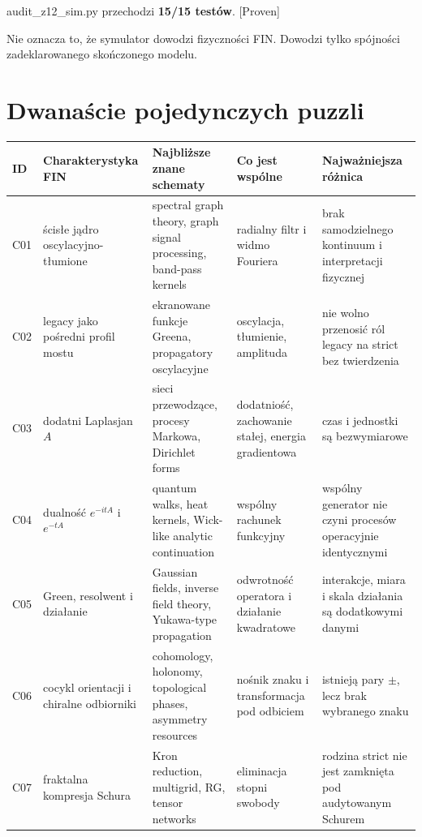 \documentclass[11pt,a4paper,openany]{report}
\newcommand{\statusProven}{\textcolor{fingreen}{[Proven]}}
\begin{document}
audit\_z12\_sim.py przechodzi \textbf{15/\allowbreak{}15 testów}. \statusProven{}

Nie oznacza to, \.ze symulator dowodzi fizyczności FIN. Dowodzi tylko spójności zadeklarowanego skończonego modelu.

\chapter{Dwanaście pojedynczych puzzli}

\begin{center}
\begingroup\footnotesize
\setlength{\tabcolsep}{3.5pt}
\renewcommand{\arraystretch}{1.16}
\begin{longtable}{@{}p{}p{}p{}p{}p{}@{}}
\toprule
\textbf{ID} & \textbf{Charakterystyka FIN} & \textbf{Najbli\.zsze znane schematy} & \textbf{Co jest wspólne} & \textbf{Najwa\.zniejsza ró\.znica} \\
\midrule
\endhead
C01 & ścisłe jądro oscylacyjno-tłumione & spectral graph theory, graph signal processing, band-pass kernels & radialny filtr i widmo Fouriera & brak samodzielnego kontinuum i interpretacji fizycznej \\
C02 & legacy jako pośredni profil mostu & ekranowane funkcje Greena, propagatory oscylacyjne & oscylacja, tłumienie, amplituda & nie wolno przenosić ról legacy na strict bez twierdzenia \\
C03 & dodatni Laplasjan \(A\) & sieci przewodzące, procesy Markowa, Dirichlet forms & dodatniość, zachowanie stałej, energia gradientowa & czas i jednostki są bezwymiarowe \\
C04 & dualność \(e^{-itA}\) i \(e^{-tA}\) & quantum walks, heat kernels, Wick-like analytic continuation & wspólny rachunek funkcyjny & wspólny generator nie czyni procesów operacyjnie identycznymi \\
C05 & Green, resolwent i działanie & Gaussian fields, inverse field theory, Yukawa-type propagation & odwrotność operatora i działanie kwadratowe & interakcje, miara i skala działania są dodatkowymi danymi \\
C06 & cocykl orientacji i chiralne odbiorniki & cohomology, holonomy, topological phases, asymmetry resources & nośnik znaku i transformacja pod odbiciem & istnieją pary \(\pm\), lecz brak wybranego znaku \\
C07 & fraktalna kompresja Schura & Kron reduction, multigrid, RG, tensor networks & eliminacja stopni swobody & rodzina strict nie jest zamknięta pod audytowanym Schurem \\

\end{longtable}
\end{center}
\end{document}
